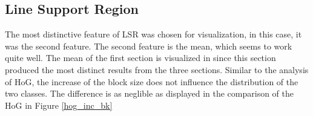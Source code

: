 
\subsection{Line Support Region}

The most distinctive feature of LSR was chosen for visualization, in this case,
it was the second feature. The second feature is the mean, which seems to work
quite well. The mean of the first section is visualized in since this section
produced the most distinct results from the three sections. Similar to the
analysis of HoG, the increase of the block size does not influence the
distribution of the two classes. The difference is as neglible as displayed in
the comparison of the HoG in Figure \ref{hog_inc_bk}


